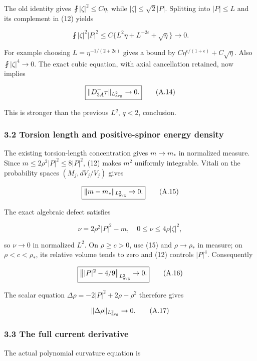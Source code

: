\documentclass[11pt]{article}
\begin{document}
The old identity gives \(\fint|\zeta|^2\le C\eta\), while
\(|\zeta|\le\sqrt2|P|\). Splitting into \(|P|\le L\) and its complement
in (12) yields

\[
 \fint|\zeta|^2|P|^2
 \le C\{L^2\eta+L^{-2\epsilon}+\sqrt\eta\}\to0.
\tag{A.13}
\]

For example choosing \(L=\eta^{-1/(2+2\epsilon)}\) gives a bound by
\(C\eta^{\epsilon/(1+\epsilon)}+C\sqrt\eta\). Also
\(\fint|\zeta|^4\to0\). The exact cubic equation, with axial
cancellation retained, now implies

\[
 \boxed{\|D^-_{3A}\tau\|_{L^2_{\rm avg}}\to0.}\tag{A.14}
\]

This is stronger than the previous \(L^q\), \(q<2\), conclusion.

\hypertarget{torsion-length-and-positive-spinor-energy-density}{%
\subsubsection{3.2 Torsion length and positive-spinor energy
density}\label{torsion-length-and-positive-spinor-energy-density}}

The existing torsion-length concentration gives \(m\to m_*\) in
normalized measure. Since \(m\le2\rho^2|P|^2\le8|P|^2\), (12) makes
\(m^2\) uniformly integrable. Vitali on the probability spaces
\((M_j,dV_j/V_j)\) gives

\[
 \boxed{\|m-m_*\|_{L^2_{\rm avg}}\to0.}\tag{A.15}
\]

The exact algebraic defect satisfies

\[
 \nu=2\rho^2|P|^2-m,\quad
 0\le\nu\le4\rho|\zeta|^2,
\]

so \(\nu\to0\) in normalized \(L^2\). On \(\rho\ge c>0\), use (15) and
\(\rho\to\rho_*\) in measure; on \(\rho<c<\rho_*\), its relative volume
tends to zero and (12) controls \(|P|^4\). Consequently

\[
 \boxed{\big\||P|^2-4/9\big\|_{L^2_{\rm avg}}\to0.}\tag{A.16}
\]

The scalar equation \(\Delta\rho=-2|P|^2+2\rho-\rho^2\) therefore gives

\[
 \|\Delta\rho\|_{L^2_{\rm avg}}\to0.\tag{A.17}
\]

\hypertarget{the-full-current-derivative}{%
\subsubsection{3.3 The full current
derivative}\label{the-full-current-derivative}}

The actual polynomial curvature equation is
\end{document}
